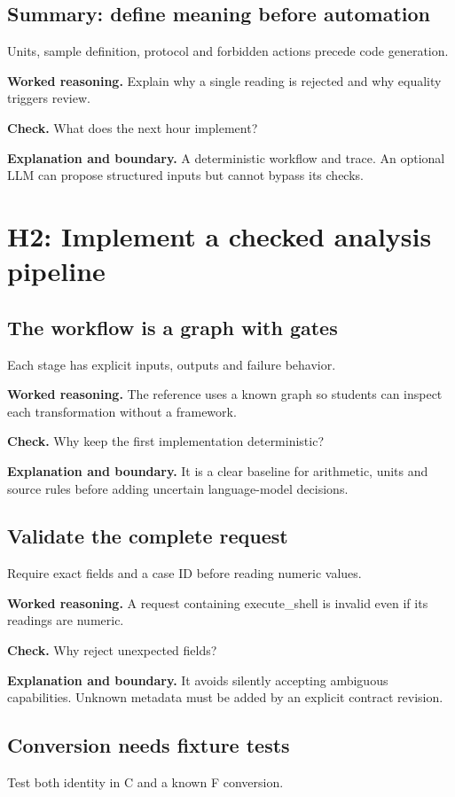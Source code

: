 \subsection{Summary: define meaning before automation}
Units, sample definition, protocol and forbidden actions precede code generation.

\textbf{Worked reasoning.} Explain why a single reading is rejected and why equality triggers review.

\textbf{Check.} What does the next hour implement?

\textbf{Explanation and boundary.} A deterministic workflow and trace. An optional LLM can propose structured inputs but cannot bypass its checks.

\section{H2: Implement a checked analysis pipeline}
\subsection{The workflow is a graph with gates}
Each stage has explicit inputs, outputs and failure behavior.

\textbf{Worked reasoning.} The reference uses a known graph so students can inspect each transformation without a framework.

\textbf{Check.} Why keep the first implementation deterministic?

\textbf{Explanation and boundary.} It is a clear baseline for arithmetic, units and source rules before adding uncertain language-model decisions.

\subsection{Validate the complete request}
Require exact fields and a case ID before reading numeric values.

\textbf{Worked reasoning.} A request containing execute\_shell is invalid even if its readings are numeric.

\textbf{Check.} Why reject unexpected fields?

\textbf{Explanation and boundary.} It avoids silently accepting ambiguous capabilities. Unknown metadata must be added by an explicit contract revision.

\subsection{Conversion needs fixture tests}
Test both identity in C and a known F conversion.

